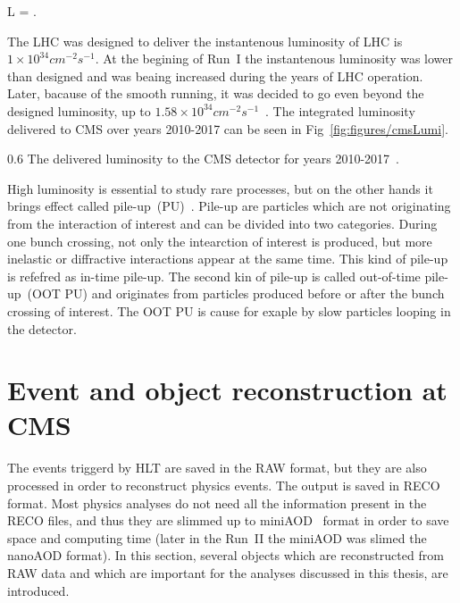 {
 L = .
}

The LHC was designed to deliver the instantenous luminosity of LHC is $1 \times 10^{34} cm^{-2}s^{-1}$. At the begining of Run~I the instantenous luminosity was lower than designed and was beaing increased during the years of LHC operation. Later, bacause of the smooth running, it was decided to go even beyond the designed luminosity, up to $1.58 \times 10^{34} cm^{-2}s^{-1}$~\cite{Pralavorio:2272474}. The integrated luminosity delivered to CMS over years 2010-2017 can be seen in Fig~\ref{fig:figures/cmsLumi}.

                 {0.6}       %
                 { The delivered luminosity to the CMS detector for years 2010-2017~\cite{website:CMSlumi}. }


High luminosity is essential to study rare processes, but on the other hands it brings effect called pile-up~(PU)~\cite{Bayatian:2006nff}. Pile-up are particles which are not originating from the interaction of interest and can be divided into two categories. During one bunch crossing, not only the intearction of interest is produced, but more inelastic or diffractive interactions appear at the same time. This kind of pile-up is refefred as in-time pile-up. The second kin of pile-up is called out-of-time pile-up~(OOT PU) and originates from particles produced before or after the bunch crossing of interest. The OOT PU is cause for exaple by slow particles looping in the detector.

\newpage

\section{Event and object reconstruction at CMS~\label{sec:objects}}

The events triggerd by HLT are saved in the RAW format, but they are also processed in order to reconstruct physics events. The output is saved in RECO format. Most physics analyses do not need all the information present in the RECO files, and thus they are slimmed up to miniAOD~\cite{Petrucciani:2029414} format in order to save space and computing time (later in the Run~II the miniAOD was slimed the nanoAOD format). In this section, several objects which are reconstructed from RAW data and which are important for the analyses discussed in this thesis, are introduced.


